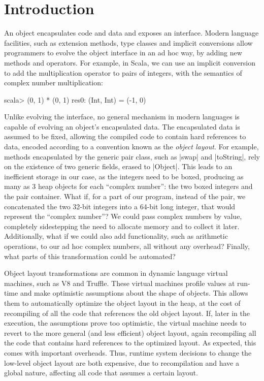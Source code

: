 \section{Introduction}
\label{sec:intro}

An object encapsulates code and data and exposes an interface. Modern
language facilities, such as extension methods, type classes and
implicit conversions allow programmers to evolve the object interface
in an ad hoc way, by adding new methods and operators. For example, in
Scala, we can use an implicit conversion to add the multiplication
operator to pairs of integers, with the semantics of complex number
multiplication:

\begin{lstlisting-nobreak}
scala> (0, 1) * (0, 1)
res0: (Int, Int) = (-1, 0)
\end{lstlisting-nobreak}

Unlike evolving the interface, no general mechanism in modern
languages is capable of evolving an object's encapsulated data. The
encapsulated data is assumed to be fixed, allowing the compiled
code to contain hard references to data, encoded according to a convention known as the
\emph{object layout}. For example, methods encapsulated
by the generic pair class, such as |swap| and |toString|, rely on the
existence of two generic fields, erased to |Object|. This leads to
an inefficient storage in our case, as the integers need to be boxed, producing as many as
3 heap objects for each ``complex number'': the two boxed integers and
the pair container. What if, for a part of  our program, instead of the pair, we
concatenated the two 32-bit integers into a 64-bit long integer, that
would represent the ``complex number''? We could pass complex numbers by value,
completely sidestepping the need to allocate memory and to collect it
later. Additionally, what if we could also add
functionality, such as arithmetic operations, to our ad hoc complex
numbers, all without any overhead? Finally, what parts of this
transformation could be automated? %

Object layout transformations are common in dynamic language virtual
machines, such as V8 and Truffle. These virtual machines profile
values at run-time and make optimistic assumptions about the shape of
objects. This allows them to automatically optimize the object layout
in the heap, at the cost of recompiling of all the code that references
 the old object layout.
If, later in the execution, the assumptions prove too optimistic, the
virtual machine needs to revert to the more general (and less
efficient) object layout, again recompiling all the code that contains
hard references to the optimized layout. As expected, this comes with
important overheads. Thus, runtime system decisions to change the
low-level object layout are both expensive, due to recompilation and
have a global nature, affecting all code that assumes a certain layout.

